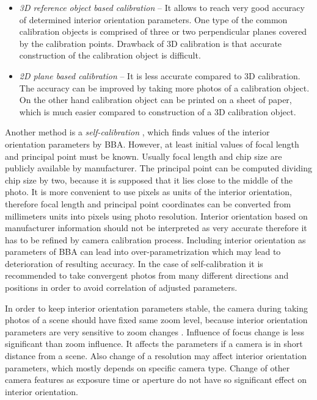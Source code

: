 \documentclass[a4paper,12pt]{article}
\newcommand{\term}[1]{%
{\it #1}%
}
\begin{document}
\begin{itemize}
\item \term{3D reference object based calibration} -- It allows to reach very good accuracy of determined 
interior orientation parameters. One type of the common calibration objects is comprised of three or two
perpendicular planes covered by the calibration points. Drawback of 3D calibration 
is that accurate construction of the calibration object is difficult.
\item \term{2D plane based calibration} -- It is less accurate compared to 3D calibration. 
The accuracy can be improved by taking more photos of a calibration object.
On the other hand calibration object can be printed on a sheet of paper, which is much 
easier compared to construction of a 3D calibration object.
\end{itemize}


Another method is a \term{self-calibration}, which finds values of the interior orientation parameters by BBA.
However, at least initial values of focal length and principal point must be known.
Usually focal length and chip size are publicly available by manufacturer. The principal point 
can be computed dividing chip size by two, because it is supposed that it lies close to 
the middle of the photo.
It is more convenient to use 
pixels as units of the interior orientation, therefore focal length and principal point coordinates can be 
converted from millimeters units into pixels using photo resolution. 
Interior orientation based on manufacturer information should not be interpreted as very accurate therefore 
it has  to be refined by camera calibration process.
Including interior orientation as parameters of BBA
can lead into over-parametrization which may lead to deterioration of resulting accuracy.
In the case of self-calibration it is recommended to take convergent photos from many different directions and positions in order
to avoid correlation of adjusted parameters. 


In order to keep interior orientation parameters stable, the camera during taking photos of a scene should have fixed same zoom level,
because interior orientation parameters are very sensitive to zoom changes \cite{labe2004geometric}.
Influence of focus change is less significant than zoom influence. It affects the parameters if a camera is in short distance
 from a scene.
Also change of a resolution may affect interior orientation parameters, which mostly depends 
on specific camera type. 
Change of other camera features as exposure time or aperture do not have so significant effect on interior
orientation.
\end{document}
